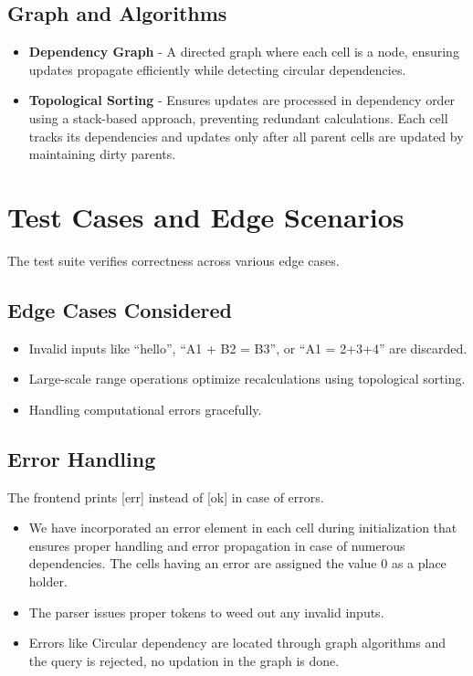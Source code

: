 \documentclass[a4paper,12pt]{article}
\begin{document}
\subsection{Graph and Algorithms}
\begin{itemize}
    \item \textbf{Dependency Graph} - A directed graph where each cell is a node, ensuring updates propagate efficiently while detecting circular dependencies.
    \item \textbf{Topological Sorting} - Ensures updates are processed in dependency order using a stack-based approach, preventing redundant calculations. Each cell tracks its dependencies and updates only after all parent cells are updated by maintaining dirty parents.
\end{itemize}

\section{Test Cases and Edge Scenarios}
The test suite verifies correctness across various edge cases.

\subsection{Edge Cases Considered}
\begin{itemize}
    \item Invalid inputs like ``hello'', ``A1 + B2 = B3'', or ``A1 = 2+3+4'' are discarded.
    \item Large-scale range operations optimize recalculations using topological sorting.
    \item Handling computational errors gracefully.
\end{itemize}

\subsection{Error Handling}
The frontend prints [err] instead of [ok] in case of errors.
\begin{itemize}
    \item We have incorporated an error element in each cell during initialization that ensures proper handling and error propagation in case of numerous dependencies. The cells having an error are assigned the value 0 as a place holder.
    \item The parser issues proper tokens to weed out any invalid inputs.
    \item Errors like Circular dependency are located through graph algorithms and the query is rejected, no updation in the graph is done.
\end{itemize}
\end{document}
